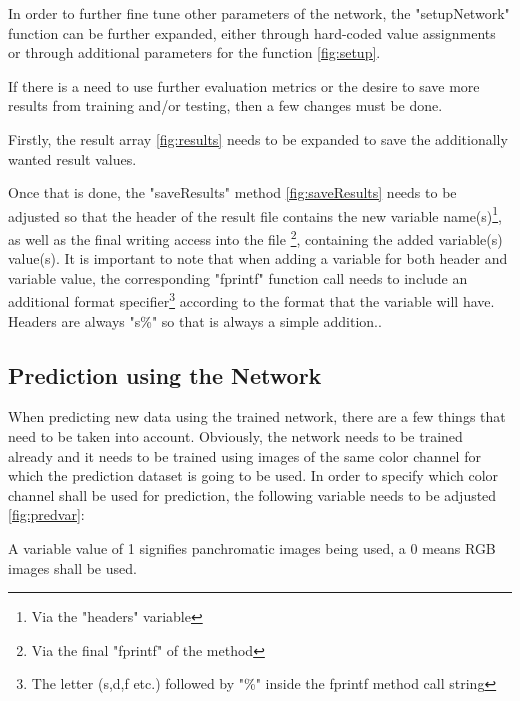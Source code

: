 In order to further fine tune other parameters of the network, the "setupNetwork" function can be further expanded, either through hard-coded value assignments or through additional parameters for the function \ref{fig:setup}.


If there is a need to use further evaluation metrics or the desire to save more results from training and/or testing, then a few changes must be done.


Firstly, the result array \ref{fig:results} needs to be expanded to save the additionally wanted result values.

Once that is done, the "saveResults" method \ref{fig:saveResults} needs to be adjusted so that the header of the result file contains the new variable name(s)\footnote{Via the "headers" variable}, as well as the final writing access into the file \footnote{Via the final "fprintf" of the method}, containing the added variable(s) value(s). It is important to note that when adding a variable for both header and variable value, the corresponding "fprintf" function call needs to include an additional format specifier\footnote{The letter (s,d,f etc.) followed by "\%" inside the fprintf method call string} according to the format that the variable will have. Headers are always "s\%" so that is always a simple addition..

\subsection{Prediction using the Network}
When predicting new data using the trained network, there are a few things that need to be taken into account. Obviously, the network needs to be trained already and it needs to be trained using images of the same color channel for which the prediction dataset is going to be used. In order to specify which color channel shall be used for prediction, the following variable needs to be adjusted \ref{fig:predvar}:


A variable value of 1 signifies panchromatic images being used, a 0 means RGB images shall be used.

